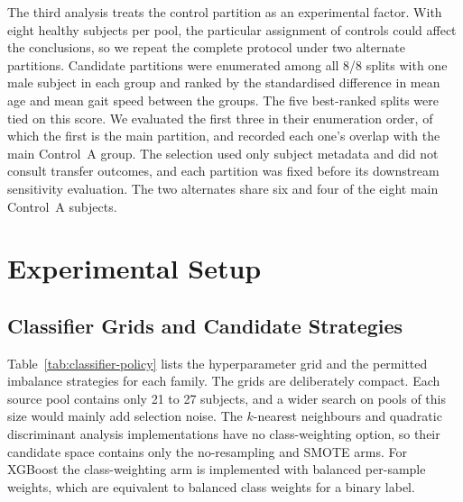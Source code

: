 \documentclass[conference]{IEEEtran}
\begin{document}
The third analysis treats the control partition as an experimental factor. With eight healthy subjects per pool, the particular assignment of controls could affect the conclusions, so we repeat the complete protocol under two alternate partitions. Candidate partitions were enumerated among all 8/8 splits with one male subject in each group and ranked by the standardised difference in mean age and mean gait speed between the groups. The five best-ranked splits were tied on this score. We evaluated the first three in their enumeration order, of which the first is the main partition, and recorded each one's overlap with the main Control~A group. The selection used only subject metadata and did not consult transfer outcomes, and each partition was fixed before its downstream sensitivity evaluation. The two alternates share six and four of the eight main Control~A subjects.

\section{Experimental Setup}
\label{sec:setup}

\subsection{Classifier Grids and Candidate Strategies}
\label{sec:setup-grids}
Table~\ref{tab:classifier-policy} lists the hyperparameter grid and the permitted imbalance strategies for each family. The grids are deliberately compact. Each source pool contains only 21 to 27 subjects, and a wider search on pools of this size would mainly add selection noise. The $k$-nearest neighbours and quadratic discriminant analysis implementations have no class-weighting option, so their candidate space contains only the no-resampling and SMOTE arms. For XGBoost the class-weighting arm is implemented with balanced per-sample weights, which are equivalent to balanced class weights for a binary label.
\end{document}
